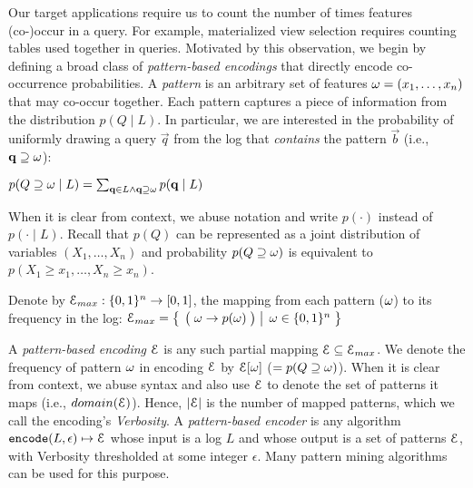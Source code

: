 Our target applications require us to count the number of times features (co-)occur in a query.  
For example, materialized view selection requires counting tables used together in queries.
Motivated by this observation, we begin by defining a broad class of \emph{pattern-based encodings} that directly encode co-occurrence probabilities.
A \emph{pattern} is an arbitrary set of features $\omega=(x_1,\ldots,x_n)$ that may co-occur together.
Each pattern captures a piece of information from the distribution $p(Q\;|\;L)$.
In particular, we are interested in the probability of uniformly drawing a query $\vec{q}$ from the log that \textit{contains} the pattern $\vec b$ (i.e., $\mathbf{q}\supseteq\omega$): \vspace*{-1mm}
\begin{center}
{\small $p(Q\supseteq\omega\;|\;L)=\sum_{\mathbf{q}\in L\land \mathbf{q}\supseteq \omega}p(\mathbf{q}\;|\;L)$}
\end{center}\vspace*{-1mm}
\noindent When it is clear from context, we abuse notation and write $p(\cdot)$ instead of $p(\cdot\;|\;L)$.
%
Recall that $p(Q)$ can be represented as a joint distribution of variables $(X_1,\ldots,X_n)$ and probability $p(Q\supseteq\omega)$ is equivalent to $p(X_1\geq x_1,\ldots,X_n\geq x_n)$.

Denote by $\mathcal E_{max} : \{0,1\}^n \rightarrow [0,1]$, the mapping from each pattern ($\omega$) to its frequency in the log: 
 $\mathcal E_{max} = \left\{\left.\;{\big(\;\omega \rightarrow p(\omega)\;\big)}\;\right|\;{\omega \in \{0,1\}^n}\;\right\}$

A \emph{pattern-based encoding} $\mathcal E$ is any such partial mapping $\mathcal E \subseteq \mathcal E_{max}$. 
We denote the frequency of pattern $\omega$ in encoding $\mathcal E$ by $\mathcal E[\omega] $ ($= p(Q\supseteq\omega)$).
When it is clear from context, we abuse syntax and also use $\mathcal E$ to denote the set of patterns it maps (i.e., $domain(\mathcal E)$).
Hence, $|\mathcal E|$ is the number of mapped patterns, which we call the encoding's \emph{Verbosity}.
A \emph{pattern-based encoder} is any algorithm $\texttt{encode}(L, \epsilon) \mapsto \mathcal E$ whose input is a log $L$ and whose output is a set of patterns $\mathcal E$, with Verbosity thresholded at some integer $\epsilon$.
Many pattern mining algorithms~\cite{DBLP:journals/tkdd/MampaeyVT12,DBLP:journals/pvldb/GebalyAGKS14} can be used for this purpose.

